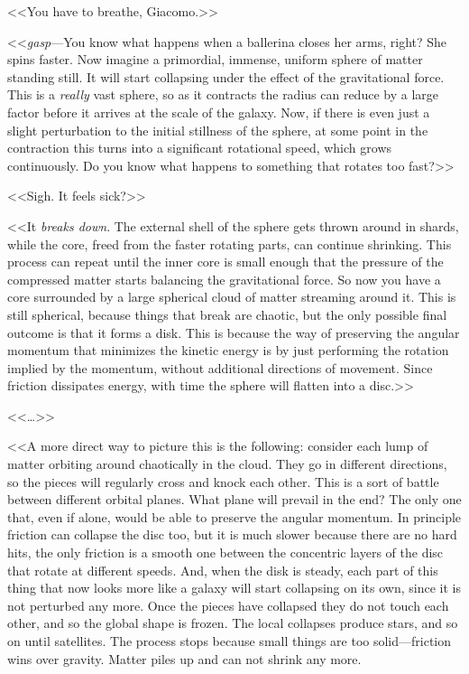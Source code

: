 <<You have to breathe, Giacomo.>>

<<\emph{gasp}---You know what happens when a ballerina closes her arms, right?
She spins faster. Now imagine a primordial, immense, uniform sphere of matter
standing still. It will start collapsing under the effect of the gravitational
force. This is a \emph{really} vast sphere, so as it contracts the radius can
reduce by a large factor before it arrives at the scale of the galaxy. Now, if
there is even just a slight perturbation to the initial stillness of the
sphere, at some point in the contraction this turns into a significant
rotational speed, which grows continuously. Do you know what happens to
something that rotates too fast?>>

<<Sigh. It feels sick?>>

<<It \emph{breaks down}. The external shell of the sphere gets thrown around in
shards, while the core, freed from the faster rotating parts, can continue
shrinking. This process can repeat until the inner core is small enough that
the pressure of the compressed matter starts balancing the gravitational force.
So now you have a core surrounded by a large spherical cloud of matter
streaming around it. This is still spherical, because things that break are
chaotic, but the only possible final outcome is that it forms a disk. This is
because the way of preserving the angular momentum that minimizes the kinetic
energy is by just performing the rotation implied by the momentum, without
additional directions of movement. Since friction dissipates energy, with time
the sphere will flatten into a disc.>>

<<\ldots>>

<<A more direct way to picture this is the following: consider each lump of
matter orbiting around chaotically in the cloud. They go in different
directions, so the pieces will regularly cross and knock each other. This is a
sort of battle between different orbital planes. What plane will prevail in the
end? The only one that, even if alone, would be able to preserve the angular
momentum. In principle friction can collapse the disc too, but it is much
slower because there are no hard hits, the only friction is a smooth one
between the concentric layers of the disc that rotate at different speeds. And,
when the disk is steady, each part of this thing that now looks more like a
galaxy will start collapsing on its own, since it is not perturbed any more.
Once the pieces have collapsed they do not touch each other, and so the global
shape is frozen. The local collapses produce stars, and so on until satellites.
The process stops because small things are too solid---friction wins over
gravity. Matter piles up and can not shrink any more.

